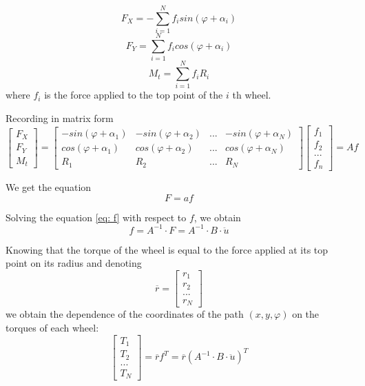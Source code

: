 \documentclass[oneside,final,14pt]{extreport}
\begin{document}
\begin{equation}
F_{X}
=
-
\sum_{i = 1} ^{N} f_{i} sin (\varphi + \alpha_{i})
\end{equation}
\begin{equation}
F_{Y}
=
\sum_{i = 1} ^{N} f_{i} cos (\varphi + \alpha_{i})
\end{equation}
\begin{equation}
M_{t}
=
\sum_{i = 1} ^{N} f_{i} R_{i}
\end{equation}
where $ f_{i} $ is the force applied to the top point of the $ i $ th wheel.

Recording in matrix form
\begin{equation}
\begin{bmatrix}
F_{X} \\
F_{Y} \\
M_{t}
\end{bmatrix}
=
\begin{bmatrix}
-sin (\varphi + \alpha_{1}) &
-sin (\varphi + \alpha_{2}) &
... &
-sin (\varphi + \alpha_{N}) \\
cos (\varphi + \alpha_{1}) &
cos (\varphi + \alpha_{2}) &
... &
cos (\varphi + \alpha_{N}) \\
R_{1} & R_{2} & ... & R_{N}
\end{bmatrix}
\begin{bmatrix}
f_{1} \\
f_{2} \\
... \\
f_{n}
\end{bmatrix}
=
Af
\end{equation}

We get the equation
\begin{equation}
F = af
\label{eq: f}
\end{equation}

Solving the equation \ref{eq: f} with respect to $ f $, we obtain
\begin{equation}
f
=
A ^{- 1}
\cdot
F
=
A ^{- 1}
\cdot
B
\cdot
\ddot{u}
\end{equation}

Knowing that the torque of the wheel is equal to the force applied at its top point on its radius and denoting
\begin{equation}
\overline{r}
=
\begin{bmatrix}
r_{1} \\
r_{2} \\
... \\
r_{N}
\end{bmatrix}
\end{equation}
we obtain the dependence of the coordinates of the path $ (x, y, \varphi) $ on the torques of each wheel:
\begin{equation}
\label{eq: dynamic_w_friction}
\begin{bmatrix}
T_{1} \\
T_{2} \\
... \\
T_{N}
\end{bmatrix}
=
\overline{r}
f ^{T}
=
\overline{r}
(
A ^{- 1}
\cdot
B
\cdot
\ddot{u}
) ^{T}
\end{equation}
\end{document}
